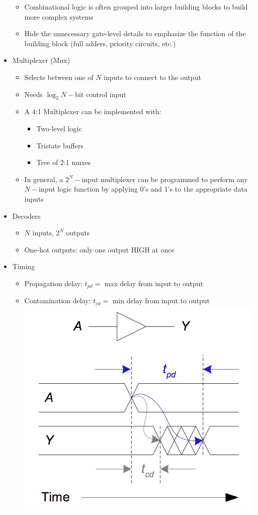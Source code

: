 \documentclass[a4paper]{article}
\begin{document}
\begin{itemize}
\begin{itemize}
\item Combinational logic is often grouped into larger building blocks to build more complex systems
\item Hide the unnecessary gate-level details to emphasize the function of the building block (full adders, priority circuits, etc.)
\end{itemize}
\item Multiplexer (Mux)
\begin{itemize}
\item Selects between one of $N$ inputs to connect to the output
\item Needs $\log_2N-$bit control input
\item A 4:1 Multiplexer can be implemented with:
\begin{itemize}
\item Two-level logic
\item Tristate buffers
\item Tree of 2:1 muxes
\end{itemize}
\item In general, a $2^N-$input multiplexer can be programmed to perform any $N-$input logic function by applying 0's and 1's to the appropriate data inputs
\end{itemize}
\item Decoders
\begin{itemize}
\item $N$ inputs, $2^N$ outputs
\item One-hot outputs: only one output HIGH at once
\end{itemize}
\item Timing
\begin{itemize}
\item Propagation delay: $t_{pd}=$ max delay from input to output
\item Contamination delay: $t_{cd}=$ min delay from input to output\\
\includegraphics[scale=0.3]{Figures/PropContDelay.jpg}

\end{itemize}
\end{itemize}
\end{document}
